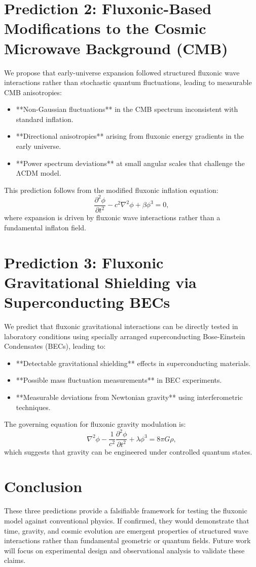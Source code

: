 \documentclass{article}
\begin{document}
\section{Prediction 2: Fluxonic-Based Modifications to the Cosmic Microwave Background (CMB)}
We propose that early-universe expansion followed structured fluxonic wave interactions rather than stochastic quantum fluctuations, leading to measurable CMB anisotropies:
\begin{itemize}
    \item **Non-Gaussian fluctuations** in the CMB spectrum inconsistent with standard inflation.
    \item **Directional anisotropies** arising from fluxonic energy gradients in the early universe.
    \item **Power spectrum deviations** at small angular scales that challenge the ΛCDM model.
\end{itemize}
This prediction follows from the modified fluxonic inflation equation:
\begin{equation}
    \frac{\partial^2 \phi}{\partial t^2} - c^2 \nabla^2 \phi + \beta \phi^3 = 0,
\end{equation}
where expansion is driven by fluxonic wave interactions rather than a fundamental inflaton field.

\section{Prediction 3: Fluxonic Gravitational Shielding via Superconducting BECs}
We predict that fluxonic gravitational interactions can be directly tested in laboratory conditions using specially arranged superconducting Bose-Einstein Condensates (BECs), leading to:
\begin{itemize}
    \item **Detectable gravitational shielding** effects in superconducting materials.
    \item **Possible mass fluctuation measurements** in BEC experiments.
    \item **Measurable deviations from Newtonian gravity** using interferometric techniques.
\end{itemize}
The governing equation for fluxonic gravity modulation is:
\begin{equation}
    \nabla^2 \phi - \frac{1}{c^2} \frac{\partial^2 \phi}{\partial t^2} + \lambda \phi^3 = 8 \pi G \rho,
\end{equation}
which suggests that gravity can be engineered under controlled quantum states.

\section{Conclusion}
These three predictions provide a falsifiable framework for testing the fluxonic model against conventional physics. If confirmed, they would demonstrate that time, gravity, and cosmic evolution are emergent properties of structured wave interactions rather than fundamental geometric or quantum fields. Future work will focus on experimental design and observational analysis to validate these claims.
\end{document}
